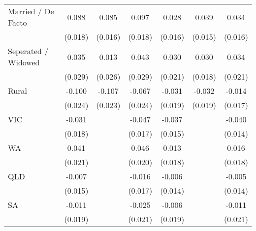{\begin{tabular}{l*{6}{c}}
Married / De Facto  &       0.088\sym{***}&       0.085\sym{***}&       0.097\sym{***}&       0.028\sym{*}  &       0.039\sym{***}&       0.034\sym{**} \\
                    &     (0.018)         &     (0.016)         &     (0.018)         &     (0.016)         &     (0.015)         &     (0.016)         \\
Seperated / Widowed &       0.035         &       0.013         &       0.043         &       0.030         &       0.030         &       0.034         \\
                    &     (0.029)         &     (0.026)         &     (0.029)         &     (0.021)         &     (0.018)         &     (0.021)         \\
Rural               &      -0.100\sym{***}&      -0.107\sym{***}&      -0.067\sym{***}&      -0.031         &      -0.032\sym{*}  &      -0.014         \\
                    &     (0.024)         &     (0.023)         &     (0.024)         &     (0.019)         &     (0.019)         &     (0.017)         \\
VIC                 &      -0.031\sym{*}  &                     &      -0.047\sym{***}&      -0.037\sym{**} &                     &      -0.040\sym{***}\\
                    &     (0.018)         &                     &     (0.017)         &     (0.015)         &                     &     (0.014)         \\
WA                  &       0.041\sym{*}  &                     &       0.046\sym{**} &       0.013         &                     &       0.016         \\
                    &     (0.021)         &                     &     (0.020)         &     (0.018)         &                     &     (0.018)         \\
QLD                 &      -0.007         &                     &      -0.016         &      -0.006         &                     &      -0.005         \\
                    &     (0.015)         &                     &     (0.017)         &     (0.014)         &                     &     (0.014)         \\
SA                  &      -0.011         &                     &      -0.025         &      -0.006         &                     &      -0.011         \\
                    &     (0.019)         &                     &     (0.021)         &     (0.019)         &                     &     (0.021)         \\

\end{tabular}}
